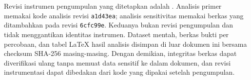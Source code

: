 Revisi instrumen pengumpulan yang ditetapkan adalah \texttt{}. Analisis primer memakai kode analisis revisi \texttt{a1d43ea}; analisis sensitivitas memakai berkas  yang ditambahkan pada revisi \texttt{6cfc99e}. Keduanya bukan revisi pengumpulan dan tidak menggantikan identitas instrumen. Dataset mentah, berkas bukti per percobaan, dan tabel LaTeX hasil analisis disimpan di luar dokumen ini bersama checksum SHA-256 masing-masing. Dengan demikian, integritas berkas dapat diverifikasi ulang tanpa memuat data sensitif ke dalam dokumen, dan revisi instrumentasi dapat dibedakan dari kode yang dipakai setelah pengumpulan.

